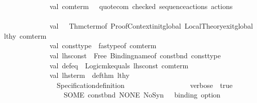 \begin{isabellebody}
\ \ \ \ \ \ \ \ \ \ \ \ \ \ val\ com{\isacharunderscore}{\kern0pt}term\ \ {\isacharequal}{\kern0pt}\ quote{\isacharunderscore}{\kern0pt}com\ checked\ {\isacharparenleft}{\kern0pt}sequence{\isacharunderscore}{\kern0pt}actions\ actions{\isacharparenright}{\kern0pt}\isanewline
\ \ \ \ \ \ \ \ \ \ \ \ \ \ \isanewline
\ \ \ \ \ \ \ \ \ \ \ \ \ \ val\ {\isacharunderscore}{\kern0pt}\ {\isacharequal}{\kern0pt}\ Thm{\isachardot}{\kern0pt}cterm{\isacharunderscore}{\kern0pt}of\ {\isacharparenleft}{\kern0pt}Proof{\isacharunderscore}{\kern0pt}Context{\isachardot}{\kern0pt}init{\isacharunderscore}{\kern0pt}global\ {\isacharparenleft}{\kern0pt}Local{\isacharunderscore}{\kern0pt}Theory{\isachardot}{\kern0pt}exit{\isacharunderscore}{\kern0pt}global\ lthy{\isacharparenright}{\kern0pt}{\isacharparenright}{\kern0pt}\ com{\isacharunderscore}{\kern0pt}term\isanewline
\ \ \ \ \ \ \ \ \ \ \ \ \ \ \isanewline
\ \ \ \ \ \ \ \ \ \ \ \ \ \ val\ const{\isacharunderscore}{\kern0pt}type\ {\isacharequal}{\kern0pt}\ fastype{\isacharunderscore}{\kern0pt}of\ com{\isacharunderscore}{\kern0pt}term\isanewline
\ \ \ \ \ \ \ \ \ \ \ \ \ \ val\ lhs{\isacharunderscore}{\kern0pt}const\ {\isacharequal}{\kern0pt}\ Free\ {\isacharparenleft}{\kern0pt}Binding{\isachardot}{\kern0pt}name{\isacharunderscore}{\kern0pt}of\ const{\isacharunderscore}{\kern0pt}bnd{\isacharcomma}{\kern0pt}\ const{\isacharunderscore}{\kern0pt}type{\isacharparenright}{\kern0pt}\isanewline
\ \ \ \ \ \ \ \ \ \ \ \ \ \ val\ def{\isacharunderscore}{\kern0pt}eq\ {\isacharequal}{\kern0pt}\ Logic{\isachardot}{\kern0pt}mk{\isacharunderscore}{\kern0pt}equals\ {\isacharparenleft}{\kern0pt}lhs{\isacharunderscore}{\kern0pt}const{\isacharcomma}{\kern0pt}\ com{\isacharunderscore}{\kern0pt}term{\isacharparenright}{\kern0pt}\isanewline
\ \ \ \ \ \ \ \ \ \ \ \ \ \ \isanewline
\ \ \ \ \ \ \ \ \ \ \ \ \ \ val\ {\isacharparenleft}{\kern0pt}{\isacharparenleft}{\kern0pt}lhs{\isacharunderscore}{\kern0pt}term{\isacharcomma}{\kern0pt}\ {\isacharparenleft}{\kern0pt}{\isacharunderscore}{\kern0pt}{\isacharcomma}{\kern0pt}\ def{\isacharunderscore}{\kern0pt}thm{\isacharparenright}{\kern0pt}{\isacharparenright}{\kern0pt}{\isacharcomma}{\kern0pt}\ lthy{\isacharprime}{\kern0pt}{\isacharparenright}{\kern0pt}\ {\isacharequal}{\kern0pt}\ \isanewline
\ \ \ \ \ \ \ \ \ \ \ \ \ \ \ \ Specification{\isachardot}{\kern0pt}definition\isanewline
\ \ \ \ \ \ \ \ \ \ \ \ \ \ \ \ \ \ {\isacharbraceleft}{\kern0pt}verbose\ {\isacharequal}{\kern0pt}\ true{\isacharbraceright}{\kern0pt}\isanewline
\ \ \ \ \ \ \ \ \ \ \ \ \ \ \ \ \ \ {\isacharparenleft}{\kern0pt}SOME\ {\isacharparenleft}{\kern0pt}const{\isacharunderscore}{\kern0pt}bnd{\isacharcomma}{\kern0pt}\ NONE{\isacharcomma}{\kern0pt}\ NoSyn{\isacharparenright}{\kern0pt}{\isacharparenright}{\kern0pt}\ \ {\isacharparenleft}{\kern0pt}{\isacharasterisk}{\kern0pt}\ binding\ option\ {\isacharasterisk}{\kern0pt}{\isacharparenright}{\kern0pt}\isanewline

\end{isabellebody}
